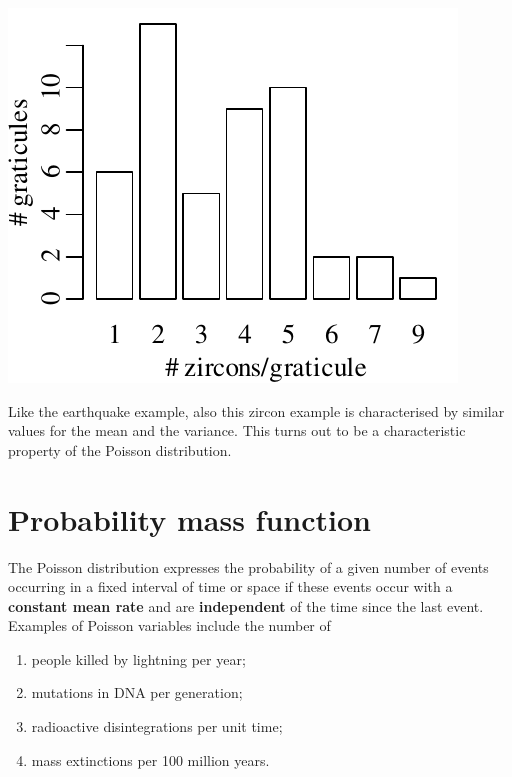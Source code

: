\noindent\begin{minipage}[t][][b]{.3\textwidth}
  \includegraphics[width=\textwidth]{../figures/zirconhist.pdf}\medskip
\end{minipage}
\begin{minipage}[t][][t]{.7\textwidth}
  \label{fig:zirconhist}
\end{minipage}

Like the earthquake example, also this zircon example is characterised
by similar values for the mean and the variance. This turns out to be
a characteristic property of the Poisson distribution.

\section{Probability mass function}
\label{sec:PMF}

The Poisson distribution expresses the probability of a given number
of events occurring in a fixed interval of time or space if these
events occur with a \textbf{constant mean rate} and are
\textbf{independent} of the time since the last event. Examples of
Poisson variables include the number of

\begin{enumerate}
\item people killed by lightning per year;
\item mutations in DNA per generation;
\item radioactive disintegrations per unit time;
\item mass extinctions per 100 million years.
\end{enumerate}

